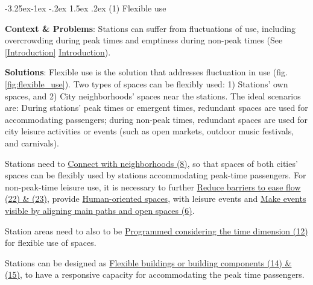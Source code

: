 \documentclass[]{article}
\begin{document}
{    %
    \renewcommand{\thesubsubsection}{}
    \makeatletter
    \renewcommand{\subsubsection}{\@startsection{subsubsection}{3}{\z@}%
      {-3.25ex\@plus -1ex \@minus -.2ex}%
      {1.5ex \@plus .2ex}%
      {\normalfont\normalsize\bfseries}}
    \makeatother



\subsubsection{(1) Flexible use}
\label{(1) Flexible use}

\textbf{Context \& Problems}: Stations can suffer from fluctuations of use, including overcrowding during peak times and emptiness during non-peak times (See \ref{Introduction} \hyperref[Introduction]{Introduction}).


\textbf{Solutions}: Flexible use is the solution that addresses fluctuation in use (fig. \ref{fig:flexible_use}). Two types of spaces can be flexibly used: 1) Stations' own spaces, and 2) City neighborhoods' spaces near the stations. The ideal scenarios are: During stations' peak times or emergent times, redundant spaces are used for accommodating passengers; during non-peak times, redundant spaces are used for city leisure activities or events (such as open markets, outdoor music festivals, and carnivals).

Stations need to \hyperref[Connect with neighborhoods]{Connect with neighborhoods (8)}, so that spaces of both cities' spaces can be flexibly used by stations accommodating peak-time passengers. For non-peak-time leisure use, it is necessary to further \hyperref[(22 23) Reduce barriers to ease flow]{Reduce barriers to ease flow (22) \& (23)}, provide \hyperref[(7) Human-oriented spaces]{Human-oriented spaces}, with leisure events and \hyperref[(6) Make events visible by aligning main paths and open spaces]{Make events visible by aligning main paths and open spaces (6)}.

Station areas need to also to be \hyperref[(12) Programming considering the time dimension]{Programmed considering the time dimension (12)} for flexible use of spaces.

Stations can be designed as \hyperref[(14 15) Flexible buildings or building components]{Flexible buildings or building components (14) \& (15)}, to have a responsive capacity for accommodating the peak time passengers. 

}
\end{document}
